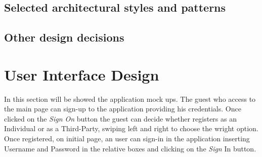 \documentclass[a4paper]{article}
\begin{document}
\newpage

\subsection{Selected architectural styles and patterns}

\newpage

\subsection{Other design decisions}

\newpage

\section{User Interface Design}


In this section will be showed the application mock ups.
\newline
The guest who access to the main page can sign-up to the application providing his credentials. Once clicked on the \textit{Sign On} button the guest can decide whether registers as an Individual or as a Third-Party, swiping left and right to choose the wright option.
\newline
Once registered, on initial page, an user can sign-in in the application inserting Username and Password in the relative boxes and clicking on the \textit{Sign} In button. 
\newline  
\newline  

\end{document}
